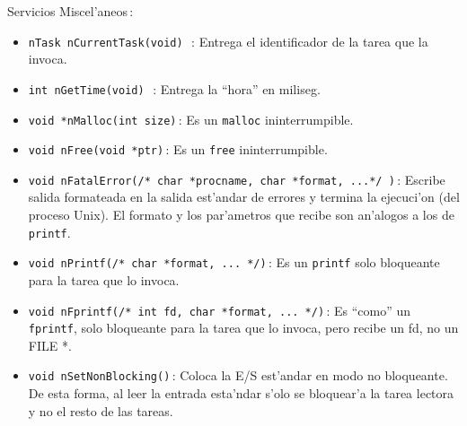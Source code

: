 Servicios Miscel'aneos\,:

\begin{itemize}

\item {\tt nTask nCurrentTask(void) }\,:
Entrega el identificador de la tarea que la invoca.

\item {\tt int nGetTime(void) }\,:
Entrega la ``hora'' en miliseg.

\item
{\tt void *nMalloc(int size)}\,:
Es un {\tt malloc} ininterrumpible.

\item
{\tt void nFree(void *ptr)}\,:
Es un {\tt free} ininterrumpible.


\item
{\tt void nFatalError(/* char *procname, char *format, ...*/ )}\,:
Escribe salida formateada en la salida est'andar de errores y termina
la ejecuci'on (del proceso Unix).  El formato y los par'ametros que
recibe son an'alogos a los de {\tt printf}.

\item
{\tt void nPrintf(/* char *format, ... */)}\,:
Es un {\tt printf} solo bloqueante para la tarea que lo invoca.

\item
{\tt void nFprintf(/* int fd, char *format, ... */)}\,: Es ``como'' un
{\tt fprintf}, solo bloqueante para la tarea que lo invoca, pero
recibe un fd, no un FILE *.

\item
{\tt void nSetNonBlocking()}\,: Coloca la E/S est'andar en modo no
bloqueante.  De esta forma, al leer la entrada esta'ndar s'olo se
bloquear'a la tarea lectora y no el resto de las tareas.

\end{itemize}


